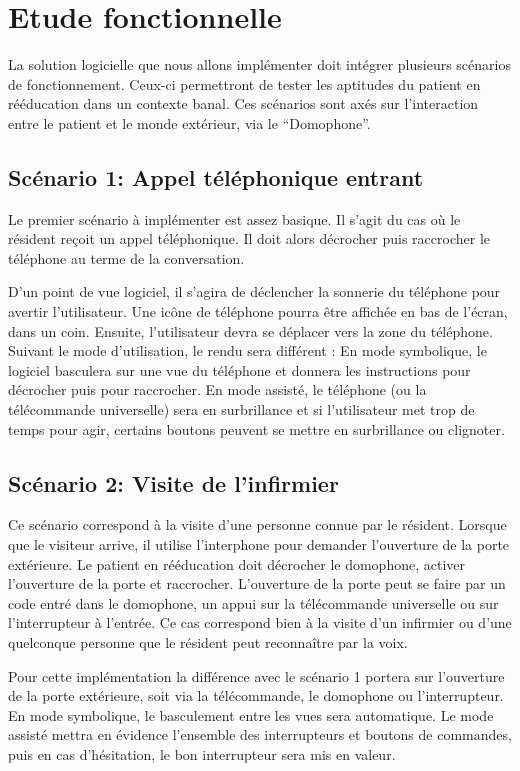 \section{Etude fonctionnelle}

La solution logicielle que nous allons implémenter doit intégrer plusieurs scénarios de fonctionnement. Ceux-ci permettront de tester les aptitudes du patient en rééducation dans un contexte banal. Ces scénarios sont axés sur l'interaction entre le patient et le monde extérieur, via le \enquote{Domophone}.

\subsection{Scénario 1: Appel téléphonique entrant}

Le premier scénario à implémenter est assez basique. Il s'agit du cas où le résident reçoit un appel téléphonique. Il doit alors décrocher puis raccrocher le téléphone au terme de la conversation.

D'un point de vue logiciel, il s'agira de déclencher la sonnerie du téléphone pour avertir l'utilisateur. Une icône de téléphone pourra être affichée en bas de l'écran, dans un coin. Ensuite, l'utilisateur devra se déplacer vers la zone du téléphone. Suivant le mode d'utilisation, le rendu sera différent : En mode symbolique, le logiciel basculera sur une vue du téléphone et donnera les instructions pour décrocher puis pour raccrocher. En mode assisté, le téléphone (ou la télécommande universelle) sera en surbrillance et si l'utilisateur met trop de temps pour agir, certains boutons peuvent se mettre en surbrillance ou clignoter.

\subsection{Scénario 2: Visite de l'infirmier}

Ce scénario correspond à la visite d'une personne connue par le résident. Lorsque que le visiteur arrive, il utilise l'interphone pour demander l'ouverture de la porte extérieure. Le patient en rééducation doit décrocher le domophone, activer l'ouverture de la porte et raccrocher. L'ouverture de la porte peut se faire par un code entré dans le domophone, un appui sur la télécommande universelle ou sur l'interrupteur à l'entrée. Ce cas correspond bien à la visite d'un infirmier ou d'une quelconque personne que le résident peut reconnaître par la voix.

Pour cette implémentation la différence avec le scénario 1 portera sur l'ouverture de la porte extérieure, soit via la télécommande, le domophone ou l'interrupteur. En mode symbolique, le basculement entre les vues sera automatique. Le mode assisté mettra en évidence l'ensemble des interrupteurs et boutons de commandes, puis en cas d'hésitation, le bon interrupteur sera mis en valeur.

